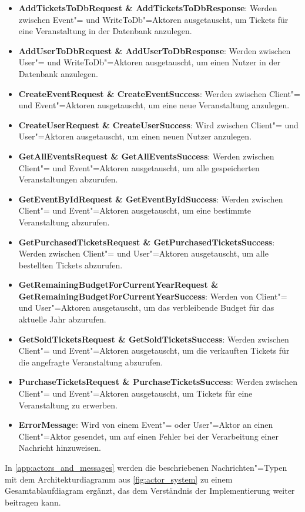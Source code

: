 \begin{itemize}[itemsep=-.5em,leftmargin=*]
    \item \textbf{AddTicketsToDbRequest \& AddTicketsToDbResponse}: Werden zwischen Event"= und WriteToDb"=Aktoren ausgetauscht, um Tickets für eine Veranstaltung in der Datenbank anzulegen.
    \item \textbf{AddUserToDbRequest \& AddUserToDbResponse}: Werden zwischen User"= und WriteToDb"=Aktoren ausgetauscht, um einen Nutzer in der Datenbank anzulegen.
    \item \textbf{CreateEventRequest \& CreateEventSuccess}:  Werden zwischen Client"= und Event"=Aktoren ausgetauscht, um eine neue Veranstaltung anzulegen.
    \item \textbf{CreateUserRequest \& CreateUserSuccess}: Wird zwischen Client"= und User"=Aktoren ausgetauscht, um einen neuen Nutzer anzulegen.
    \item \textbf{GetAllEventsRequest \& GetAllEventsSuccess}: Werden zwischen Client"= und Event"=Aktoren ausgetauscht, um alle gespeicherten Veranstaltungen abzurufen.
    \item \textbf{GetEventByIdRequest \& GetEventByIdSuccess}: Werden zwischen Client"= und Event"=Aktoren ausgetauscht, um eine bestimmte Veranstaltung abzurufen.
    \item \textbf{GetPurchasedTicketsRequest \& GetPurchasedTicketsSuccess}: Werden zwischen Client"= und User"=Aktoren ausgetauscht, um alle bestellten Tickets abzurufen.
    \item \textbf{GetRemainingBudgetForCurrentYearRequest \& GetRemainingBudgetForCurrentYearSuccess}: Werden von Client"= und User"=Aktoren ausgetauscht, um das verbleibende Budget für das aktuelle Jahr abzurufen.
    \item \textbf{GetSoldTicketsRequest \& GetSoldTicketsSuccess}: Werden zwischen Client"= und Event"=Aktoren ausgetauscht, um die verkauften Tickets für die angefragte Veranstaltung abzurufen.
    \item \textbf{PurchaseTicketsRequest \& PurchaseTicketsSuccess}: Werden zwischen Client"= und Event"=Aktoren ausgetauscht, um Tickets für eine Veranstaltung zu erwerben.
    \item \textbf{ErrorMessage}: Wird von einem Event"= oder User"=Aktor an einen Client"=Aktor gesendet, um auf einen Fehler bei der Verarbeitung einer Nachricht hinzuweisen.
\end{itemize}

In \autoref{app:actors_and_messages} werden die beschriebenen Nachrichten"=Typen mit dem Architekturdiagramm aus \autoref{fig:actor_system} zu einem Gesamtablaufdiagram ergänzt, das dem Verständnis der Implementierung weiter beitragen kann.
